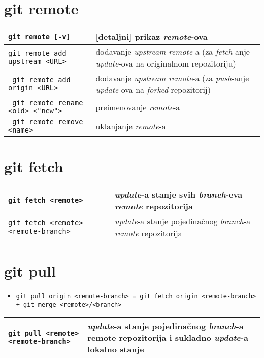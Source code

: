 \documentclass[10pt]{article}
\begin{document}
    \section*{git remote}
    \begin{tabular}{|>{\tt}p{9.00cm}|>{}p{15.50cm}|}
        \hline
        git remote [-v]                                 & [detaljni] prikaz \textit{remote}-ova \\ \hline
        git remote add upstream <URL>                   & dodavanje \textit{upstream remote}-a (za \textit{fetch}-anje \textit{update}-ova na originalnom repozitoriju) \\ \hline
        git remote add origin <URL>                     & dodavanje \textit{upstream remote}-a (za \textit{push}-anje \textit{update}-ova na \textit{forked} repozitorij) \\ \hline
        git remote rename <old> <"new">                 & preimenovanje \textit{remote}-a \\ \hline  
        git remote remove <name>                        & uklanjanje \textit{remote}-a \\ \hline                 
    \end{tabular}

    \section*{git fetch}
    \begin{tabular}{|>{\tt}p{9.00cm}|>{}p{15.50cm}|}
        \hline
        git fetch <remote>                              & \textit{update}-a stanje svih \textit{branch}-eva \textit{remote} repozitorija \\ \hline
        git fetch <remote> <remote-branch>              & \textit{update}-a stanje pojedinačnog \textit{branch}-a \textit{remote} repozitorija \\ \hline                
    \end{tabular}

    \section*{git pull}
    \begin{itemize}
        \item \texttt{git pull origin <remote-branch> = git fetch origin <remote-branch> + git merge <remote>/<branch>}
    \end{itemize}
    \begin{tabular}{|>{\tt}p{9.00cm}|>{}p{15.50cm}|}
        \hline
        git pull <remote> <remote-branch>               & \textit{update}-a stanje pojedinačnog \textit{branch}-a remote repozitorija i sukladno \textit{update}-a lokalno stanje \\ \hline                
    \end{tabular}
\end{document}
